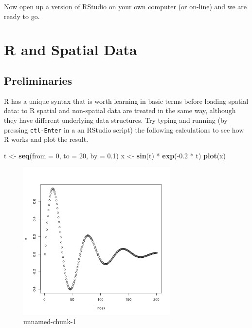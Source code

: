 \documentclass[]{article}
\newenvironment{Shaded}{}{}
\newcommand{\KeywordTok}[1]{\textcolor[rgb]{0.00,0.44,0.13}{\textbf{{#1}}}}
\newcommand{\DataTypeTok}[1]{\textcolor[rgb]{0.56,0.13,0.00}{{#1}}}
\newcommand{\DecValTok}[1]{\textcolor[rgb]{0.25,0.63,0.44}{{#1}}}
\newcommand{\FloatTok}[1]{\textcolor[rgb]{0.25,0.63,0.44}{{#1}}}
\newcommand{\NormalTok}[1]{{#1}}
\let\Oldincludegraphics\includegraphics
\renewcommand{\includegraphics}[1]{\Oldincludegraphics[width=8cm]{#1}}
\begin{document}
Now open up a version of RStudio on your own computer (or on-line) and
we are ready to go.

\section{R and Spatial Data}

\subsection{Preliminaries}

R has a unique syntax that is worth learning in basic terms before
loading spatial data: to R spatial and non-spatial data are treated in
the same way, although they have different underlying data structures.
Try typing and running (by pressing \texttt{ctl-Enter} in a an RStudio
script) the following calculations to see how R works and plot the
result.

\begin{Shaded}
\begin{Highlighting}[]
\NormalTok{t <- }\KeywordTok{seq}\NormalTok{(}\DataTypeTok{from =} \DecValTok{0}\NormalTok{, }\DataTypeTok{to =} \DecValTok{20}\NormalTok{, }\DataTypeTok{by =} \FloatTok{0.1}\NormalTok{)}
\NormalTok{x <- }\KeywordTok{sin}\NormalTok{(t) * }\KeywordTok{exp}\NormalTok{(-}\FloatTok{0.2} \NormalTok{* t)}
\KeywordTok{plot}\NormalTok{(x)}
\end{Highlighting}
\end{Shaded}
\begin{figure}[htbp]
\centering
\includegraphics{figure/unnamed-chunk-1.png}
\caption{unnamed-chunk-1}
\end{figure}
\end{document}
